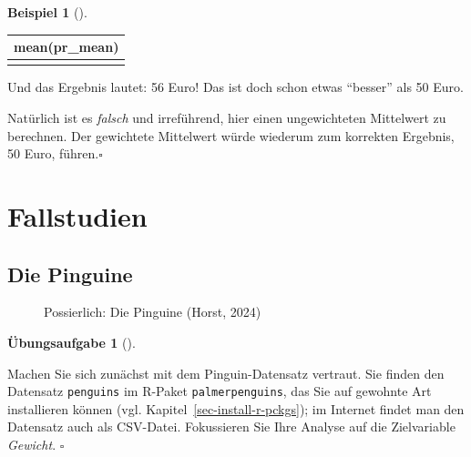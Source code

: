 \documentclass[
  a4paper,
]{scrbook}
\theoremstyle{definition}
\newtheorem{example}{Beispiel}[chapter]
\theoremstyle{definition}
\theoremstyle{definition}
\newtheorem{exercise}{Übungsaufgabe}[chapter]
\theoremstyle{remark}
\begin{document}
\begin{example}[]
\begin{longtable}[]{@{}r@{}}
\toprule\noalign{}
mean(pr\_mean) \\
\midrule\noalign{}
\endhead
\bottomrule\noalign{}
\endlastfoot
56 \\
\end{longtable}

Und das Ergebnis lautet: 56 Euro! Das ist doch schon etwas ``besser''
als 50 Euro.

Natürlich ist es \emph{falsch} und irreführend, hier einen ungewichteten
Mittelwert zu berechnen. Der gewichtete Mittelwert würde wiederum zum
korrekten Ergebnis, 50 Euro, führen.\(\square\)

\end{example}

\section{Fallstudien}\label{fallstudien}

\subsection{Die Pinguine}\label{die-pinguine}

\begin{figure}


\caption{\label{fig-penguins}Possierlich: Die Pinguine (Horst, 2024)}

\end{figure}%

\begin{exercise}[]\protect\hypertarget{exr-peng-start}{}\label{exr-peng-start}

Machen Sie sich zunächst mit dem Pinguin-Datensatz vertraut. Sie finden
den Datensatz \texttt{penguins} im R-Paket \texttt{palmerpenguins}, das
Sie auf gewohnte Art installieren können (vgl.
Kapitel~\ref{sec-install-r-pckgs}); im Internet findet man den Datensatz
auch als CSV-Datei. Fokussieren Sie Ihre Analyse auf die Zielvariable
\emph{Gewicht}. \(\square\)

\end{exercise}
\end{document}
